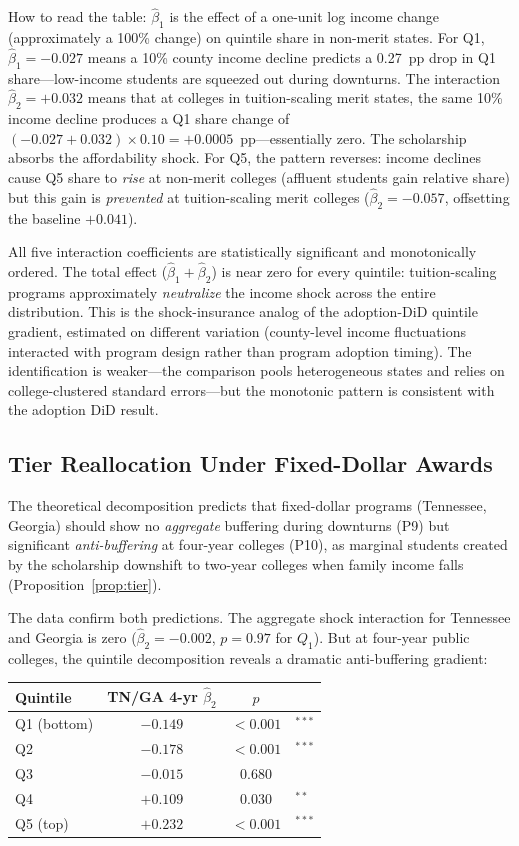 How to read the table: $\hat\beta_1$ is the effect of a one-unit log
income change (approximately a 100\% change) on quintile share in
non-merit states. For Q1, $\hat\beta_1 = -0.027$ means a 10\% county
income decline predicts a 0.27~pp drop in Q1 share---low-income
students are squeezed out during downturns. The interaction
$\hat\beta_2 = +0.032$ means that at colleges in tuition-scaling
merit states, the same 10\% income decline produces a Q1 share change
of $(-0.027 + 0.032) \times 0.10 = +0.0005$~pp---essentially zero.
The scholarship absorbs the affordability shock. For Q5, the pattern
reverses: income declines cause Q5 share to \emph{rise} at non-merit
colleges (affluent students gain relative share) but this gain is
\emph{prevented} at tuition-scaling merit colleges
($\hat\beta_2 = -0.057$, offsetting the baseline $+0.041$).

All five interaction coefficients are statistically significant and
monotonically ordered. The total effect ($\hat\beta_1 + \hat\beta_2$)
is near zero for every quintile: tuition-scaling programs approximately
\emph{neutralize} the income shock across the entire distribution.
This is the shock-insurance analog of the adoption-DiD quintile
gradient, estimated on different variation (county-level income
fluctuations interacted with program design rather than program
adoption timing). The identification is weaker---the comparison
pools heterogeneous states and relies on college-clustered standard
errors---but the monotonic pattern is consistent with the adoption
DiD result.

\subsection{Tier Reallocation Under Fixed-Dollar Awards}
\label{sec:results_tier_reallocation}

The theoretical decomposition predicts that fixed-dollar programs
(Tennessee, Georgia) should show no \emph{aggregate} buffering during
downturns (P9) but significant \emph{anti-buffering} at four-year
colleges (P10), as marginal students created by the scholarship
downshift to two-year colleges when family income falls
(Proposition~\ref{prop:tier}).

The data confirm both predictions. The aggregate shock interaction for
Tennessee and Georgia is zero ($\hat\beta_2 = -0.002$, $p = 0.97$ for
$Q_1$). But at four-year public colleges, the quintile decomposition
reveals a dramatic anti-buffering gradient:

\begin{center}
\begin{tabular}{lccl}
\toprule
Quintile & TN/GA 4-yr $\hat\beta_2$ & $p$ & \\
\midrule
Q1 (bottom) & $-0.149$ & $<0.001$ & $^{***}$ \\
Q2 & $-0.178$ & $<0.001$ & $^{***}$ \\
Q3 & $-0.015$ & $0.680$ & \\
Q4 & $+0.109$ & $0.030$ & $^{**}$ \\
Q5 (top) & $+0.232$ & $<0.001$ & $^{***}$ \\
\bottomrule
\end{tabular}
\end{center}

